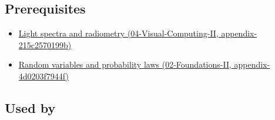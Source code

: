 \subsection{Prerequisites}\label{appendix-4815cd87ab8b-prerequisites}

\begin{itemize}
\tightlist
\item
  \href{../04-Visual-Computing-II/main.pdf\#nameddest=appendix-215c2570199b}{Light spectra and radiometry (04-Visual-Computing-II, appendix-215c2570199b)}
\item
  \href{../02-Foundations-II/main.pdf\#nameddest=appendix-4d0203f7944f}{Random variables and probability laws (02-Foundations-II, appendix-4d0203f7944f)}
\end{itemize}

\subsection{Used by}\label{appendix-4815cd87ab8b-used-by}

